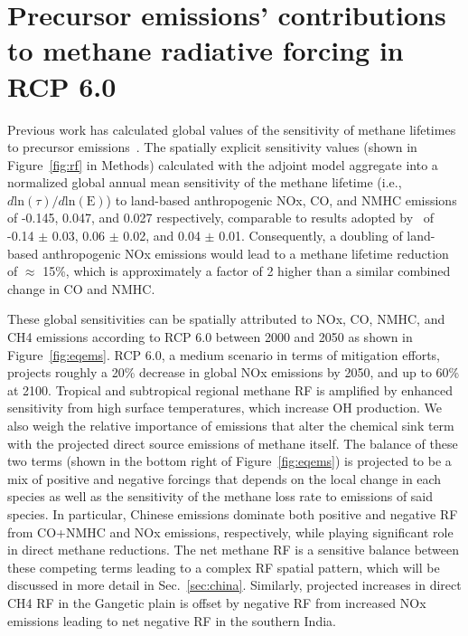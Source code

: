 \section{Precursor emissions' contributions to methane radiative forcing in RCP 6.0}

Previous work has calculated global values of the sensitivity of methane lifetimes to precursor emissions~\citep{ref:fry2012,ref:holmes2013}. The spatially explicit sensitivity values (shown in Figure~\ref{fig:rf} in Methods) calculated with the adjoint model aggregate into a normalized global annual mean sensitivity of the methane lifetime (i.e., $d \mathrm{ln}(\tau)/d\mathrm{ln}(\mathrm{E})$) to land-based anthropogenic NOx, CO, and NMHC emissions of -0.145, 0.047, and 0.027 respectively, comparable to results adopted by~\citet{ref:holmes2013} of -0.14 $\pm$ 0.03, 0.06 $\pm$ 0.02, and 0.04 $\pm$ 0.01. Consequently, a doubling of land-based anthropogenic NOx emissions would lead to a methane lifetime reduction of $\approx$ 15\%, which is approximately a factor of 2 higher than a similar combined change in CO and NMHC.  


These global sensitivities can be spatially attributed to NOx, CO, NMHC, and CH4 emissions according to RCP 6.0 between 2000 and 2050 as shown in Figure~\ref{fig:eqems}. RCP 6.0, a medium scenario in terms of mitigation efforts, projects roughly a 20\% decrease in global NOx emissions by 2050, and up to 60\% at 2100. Tropical and subtropical regional methane RF is amplified by enhanced sensitivity from high surface temperatures, which increase OH production. We also weigh the relative importance of emissions that alter the chemical sink term with the projected direct source emissions of methane itself. The balance of these two terms (shown in the bottom right of Figure~\ref{fig:eqems}) is projected to be a mix of positive and negative forcings that depends on the local change in each species as well as the sensitivity of the methane loss rate to emissions of said species. In particular, Chinese emissions dominate both positive and negative RF from CO+NMHC and NOx emissions, respectively, while playing significant role in direct methane reductions.  The net methane RF is a sensitive balance between these competing terms leading to a complex RF spatial pattern, which will be discussed in more detail in Sec.~\ref{sec:china}.  Similarly, projected increases in direct CH4 RF in the Gangetic plain is offset by negative RF from increased NOx emissions leading to net negative RF in the southern India.  

